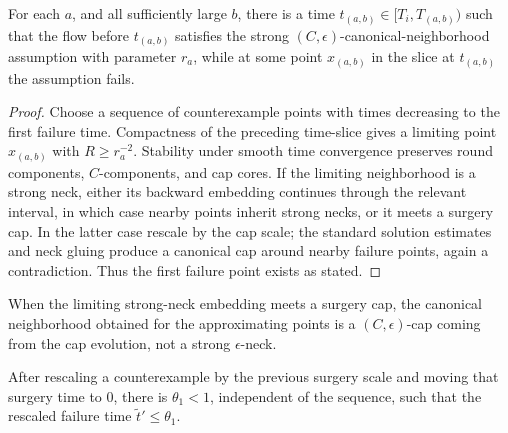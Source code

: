 \begin{lemma}
\label{lem:limit-canonical-neighborhood-fails-at-surgery-scale}
\label{16.2}
For each $a$, and all sufficiently large $b$, there is a time
$t_{(a,b)}\in[T_i,T_{(a,b)})$ such that the flow before $t_{(a,b)}$ satisfies
the strong $(C,\epsilon)$-canonical-neighborhood assumption with parameter
$r_a$, while at some point $x_{(a,b)}$ in the slice at $t_{(a,b)}$ the assumption
fails.
\end{lemma}

\begin{proof}
\sketch
{}
Choose a sequence of counterexample points with times decreasing to the first
failure time. Compactness of the preceding time-slice gives a limiting point
$x_{(a,b)}$ with $R\geq r_a^{-2}$. Stability under smooth time convergence
preserves round components, $C$-components, and cap cores. If the limiting
neighborhood is a strong neck, either its backward embedding continues through
the relevant interval, in which case nearby points inherit strong necks, or it
meets a surgery cap. In the latter case rescale by the cap scale; the standard
solution estimates and neck gluing produce a canonical cap around nearby failure
points, again a contradiction. Thus the first failure point exists as stated.
\end{proof}

\begin{remark}
\label{rem:limit-canonical-neighborhood-is-cap}

When the limiting strong-neck embedding meets a surgery cap, the canonical
neighborhood obtained for the approximating points is a $(C,\epsilon)$-cap
coming from the cap evolution, not a strong $\epsilon$-neck.
\end{remark}

\begin{claim}
\label{claim:tilde-t-prime-bounded-by-theta1}

After rescaling a counterexample by the previous surgery scale and moving that
surgery time to $0$, there is $\theta_1<1$, independent of the sequence, such
that the rescaled failure time $\widetilde t'\leq\theta_1$.
\end{claim}


